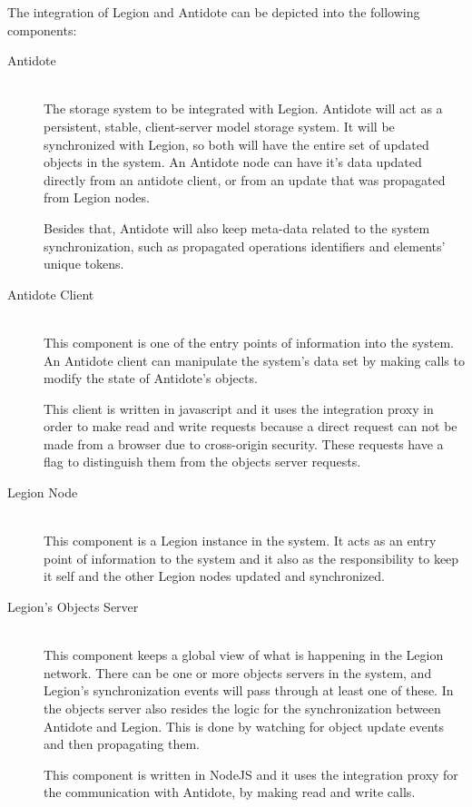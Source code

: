 \par
	The integration of Legion and Antidote can be depicted into the following components:
\begin{description}

\item[Antidote] \hfill \\
The storage system to be integrated with Legion. Antidote will act as a persistent, stable, client-server model storage system. It will be synchronized with Legion, so both will have the entire set of updated objects in the system. An Antidote node can have it's data updated directly from an antidote client, or from an update that was propagated from Legion nodes.\par
Besides that, Antidote will also keep meta-data related to the system synchronization, such as propagated operations identifiers and elements' unique tokens.

\item[Antidote Client] \hfill \\
This component is one of the entry points of information into the system. An Antidote client can manipulate the system's data set by making calls to modify the state of Antidote's objects.\par
	This client is written in javascript and it uses the integration proxy in order to make read and write requests because a direct request can not be made from a browser due to cross-origin security. These requests have a flag to distinguish them from the objects server requests.


\item[Legion Node] \hfill \\
This component is a Legion instance in the system. It acts as an entry point of information to the system and it also as the responsibility to keep it self and the other Legion nodes updated and synchronized.


\item[Legion's Objects Server] \hfill \\
This component keeps a global view of what is happening in the Legion network. There can be one or more objects servers in the system, and Legion's synchronization events will pass through at least one of these. In the objects server also resides the logic for the synchronization between Antidote and Legion. This is done by watching for object update events and then propagating them.\par
This component is written in NodeJS and it uses the integration proxy for the communication with Antidote, by making read and write calls.


\end{description}
